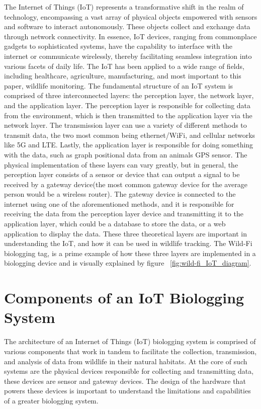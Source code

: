\documentclass[sigplan,screen,nonacm]{acmart}
\begin{document}
The Internet of Things (IoT) represents a transformative shift in the
realm of technology, encompassing a vast array of physical objects empowered
with sensors and software to interact autonomously. These objects collect and
exchange data through network connectivity. In essence, IoT devices, ranging
from commonplace gadgets to sophisticated systems, have the capability to
interface with the internet or communicate wirelessly, thereby facilitating
seamless integration into various facets of daily life. The IoT has been
applied to a wide range of fields, including healthcare, agriculture,
manufacturing, and most important to this paper, wildlife monitoring.
The fundamental structure of an IoT system is comprised of three
interconnected layers: the perception layer, the network layer, and the
application layer\cite{kumar2019internet}. The perception layer is responsible for collecting data
from the environment, which is then transmitted to the application layer via the network layer.
The transmission layer can use a variety of different methods to transmit data, the two most common being
ethernet/WiFi, and cellular networks like 5G and LTE\cite{greengard2021internet}. Lastly, the application
layer is responsible for doing something with the data, such as graph positional data from an
animals GPS sensor. The physical implementation of these layers
can vary greatly, but in general, the perception layer consists of a sensor or device that can
output a signal to be received by a gateway device(the most common gateway device for
the average person would be a wireless router). The gateway device is connected to
the internet using one of the aforementioned methods, and it is responsible for
receiving the data from the perception layer device and transmitting it to the application
layer, which could be a database to store the data, or a web application to display
the data\cite{kumar2019internet}. These three theoretical layers are important in understanding the IoT,
and how it can be used in wildlife tracking. The Wild-Fi biologging tag, is a prime example 
of how these three layers are implemented in a biologging device and is visually explained 
by figure ~\ref{fig:wild-fi_IoT_diagram}.

\section{Components of an IoT Biologging System}
\label{sec:Components of a IoT Biologging Device}

The architecture of an Internet of Things (IoT) biologging system is comprised of various 
components that work in tandem to facilitate the collection, transmission, and analysis of data from 
wildlife in their natural habitats. At the core of such systems are the physical devices responsible 
for collecting and transmitting data, these devices are sensor and gateway devices. The design 
of the hardware that powers these devices is important to understand the limitations and capabilities 
of a greater biologging system.
\end{document}
